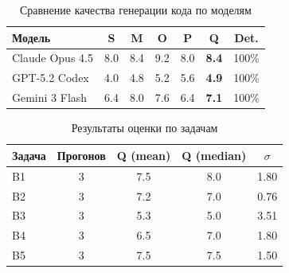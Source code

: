 
\begin{table}[htbp]
\centering
\caption{Сравнение качества генерации кода по моделям}
\label{tab:model-comparison}
\begin{tabular}{lcccccc}
\toprule
Модель & S & M & O & P & Q & Det. \\
\midrule
Claude Opus 4.5 & 8.0 & 8.4 & 9.2 & 8.0 & \textbf{8.4} & 100\% \\
GPT-5.2 Codex & 4.0 & 4.8 & 5.2 & 5.6 & \textbf{4.9} & 100\% \\
Gemini 3 Flash & 6.4 & 8.0 & 7.6 & 6.4 & \textbf{7.1} & 100\% \\
\bottomrule
\end{tabular}
\end{table}

\begin{table}[htbp]
\centering
\caption{Результаты оценки по задачам}
\label{tab:task-results}
\begin{tabular}{lcccc}
\toprule
Задача & Прогонов & Q (mean) & Q (median) & $\sigma$ \\
\midrule
B1 & 3 & 7.5 & 8.0 & 1.80 \\
B2 & 3 & 7.2 & 7.0 & 0.76 \\
B3 & 3 & 5.3 & 5.0 & 3.51 \\
B4 & 3 & 6.5 & 7.0 & 1.80 \\
B5 & 3 & 7.5 & 7.5 & 1.50 \\
\bottomrule
\end{tabular}
\end{table}